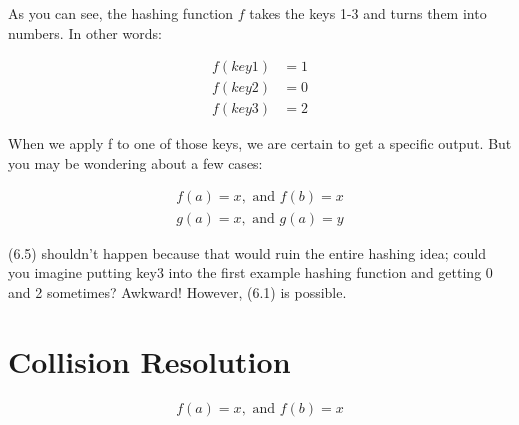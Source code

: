 \documentclass[11pt]{book}
\begin{document}
		\begin{center}
		\end{center}

		\noindent As you can see, the hashing function $f$ takes the keys 1-3 and turns
		them into numbers. In other words:

		\begin{align}
			f(key1) &= 1 \\
			f(key2) &= 0 \\
			f(key3) &= 2
		\end{align}

		\noindent When we apply f to one of those keys, we are certain to get a specific
		output. But you may be wondering about a few cases:

		\begin{align}
			f(a) = x, \text{ and } f(b) = x \\
			g(a) = x, \text{ and } g(a) = y
		\end{align}

		\noindent (6.5) shouldn't happen because that would ruin the entire hashing idea;
		could you imagine putting key3 into the first example hashing function and getting
		0 and 2 sometimes? Awkward! However, (6.1) is possible.

	\section{Collision Resolution}
		\begin{align}
			f(a) = x, \text{ and } f(b) = x
		\end{align}
\end{document}
